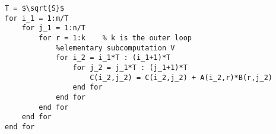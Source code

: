 \begin{lstlisting}[float=h, caption=Pseudocode of I/O optimal sequential MMM, 
label=lst:pseudocode]
T = $\sqrt{S}$
for i_1 = 1:m/T
	for j_1 = 1:n/T
		for r = 1:k    % k is the outer loop
			%elementary subcomputation V
			for i_2 = i_1*T : (i_1+1)*T
				for j_2 = j_1*T : (j_1+1)*T
					C(i_2,j_2) = C(i_2,j_2) + A(i_2,r)*B(r,j_2)
				end for
			end for 
		end for
	end for 
end for
\end{lstlisting}
%

%
%
%
%
